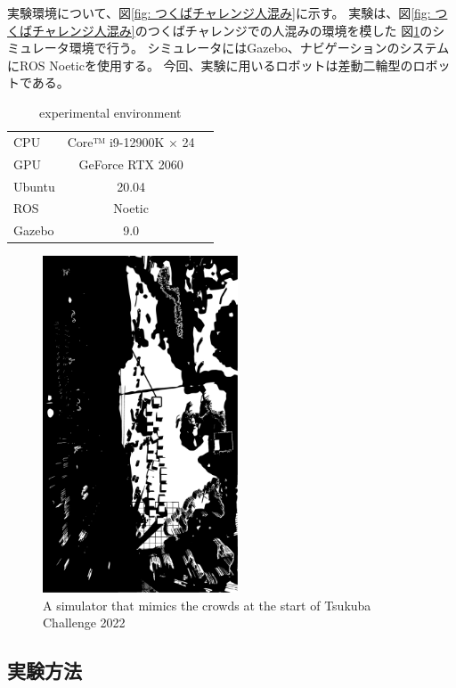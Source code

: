 \documentclass{jarticle}
\begin{document}
実験環境について、図\ref{fig: つくばチャレンジ人混み}に示す。
実験は、図\ref{fig: つくばチャレンジ人混み}のつくばチャレンジでの人混みの環境を模した
図\ref{fig: つくばチャレンジ人混みシミュレータ}のシミュレータ環境で行う。
シミュレータにはGazebo、ナビゲーションのシステムにROS Noeticを使用する。
今回、実験に用いるロボットは差動二輪型のロボットである。

\begin{table}[hbtp]
  \caption{experimental environment}
  \label{table:data_type}
  \centering
  \begin{tabular}{lcr}
    \hline
    CPU & Core™ i9-12900K × 24 \\
    GPU & GeForce RTX 2060 \\
    Ubuntu & 20.04 \\
    ROS  & Noetic \\
    Gazebo  &  9.0 \\
    \hline
  \end{tabular}
\end{table}

\begin{figure}[h]
  \centering
   \includegraphics[height=100mm]{fig/simulator.eps}
   \vspace*{-4mm}
   \caption{A simulator that mimics the crowds at the start of Tsukuba Challenge 2022}
   \label{fig: つくばチャレンジ人混みシミュレータ}
 \end{figure}

\subsection{実験方法}
\end{document}
